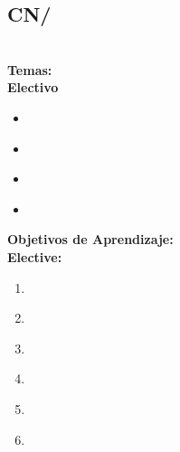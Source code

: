 \subsection{CN/\CNInteractiveVisualization}\label{sec:BOK:CNInteractiveVisualization}
\CNInteractiveVisualizationDescription\\
\noindent \textbf{Temas:}\\
\noindent \textbf{Electivo}
\begin{itemize}
	\item \CNInteractiveVisualizationTopicPrinciples\label{sec:BOK:CNInteractiveVisualizationTopicPrinciples}
	\item \CNInteractiveVisualizationTopicGraphing\label{sec:BOK:CNInteractiveVisualizationTopicGraphing}
	\item \CNInteractiveVisualizationTopicImage\label{sec:BOK:CNInteractiveVisualizationTopicImage}
	\item \CNInteractiveVisualizationTopicScalability\label{sec:BOK:CNInteractiveVisualizationTopicScalability}
\end{itemize}


\noindent \textbf{Objetivos de Aprendizaje:}\\
\noindent \textbf{Elective:}
\begin{enumerate}
	\setcounter{enumi}{0}
	\item \CNInteractiveVisualizationLOCompareCommon\xspace[\CNInteractiveVisualizationLOCompareCommonLevel]\label{sec:BOK:CNInteractiveVisualizationLOCompareCommon}
	\item \CNInteractiveVisualizationLOUseStandard\xspace[\CNInteractiveVisualizationLOUseStandardLevel]\label{sec:BOK:CNInteractiveVisualizationLOUseStandard}
	\item \CNInteractiveVisualizationLODescribeSeveralUsing\xspace[\CNInteractiveVisualizationLODescribeSeveralUsingLevel]\label{sec:BOK:CNInteractiveVisualizationLODescribeSeveralUsing}
	\item \CNInteractiveVisualizationLOExtract\xspace[\CNInteractiveVisualizationLOExtractLevel]\label{sec:BOK:CNInteractiveVisualizationLOExtract}
	\item \CNInteractiveVisualizationLOAnalyzeAnd\xspace[\CNInteractiveVisualizationLOAnalyzeAndLevel]\label{sec:BOK:CNInteractiveVisualizationLOAnalyzeAnd}
	\item \CNInteractiveVisualizationLODescribeIssues\xspace[\CNInteractiveVisualizationLODescribeIssuesLevel]\label{sec:BOK:CNInteractiveVisualizationLODescribeIssues}
\end{enumerate}


